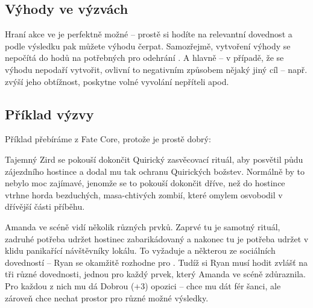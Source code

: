 \documentclass[../main.tex]{subfiles}
\begin{document}
\subsection{Výhody ve výzvách}
\label{sec:výhody-výzvy}

Hraní akce  ve  je perfektně možné – prostě si hodíte
na relevantní dovednost a podle výsledku pak můžete výhodu čerpat. Samozřejmě, vytvoření
výhody se nepočítá do hodů na  potřebných pro odehrání . A
hlavně – v případě, že se výhodu nepodaří vytvořit, ovlivní to negativním způsobem nějaký
jiný cíl – např. zvýší jeho obtížnost, poskytne volné vyvolání nepříteli apod.

\subsection{Příklad výzvy}
\label{sec:příklad-výzvy}

Příklad  přebíráme z Fate Core, protože je prostě dobrý:

Tajemný Zird se pokouší dokončit Quirický zasvěcovací rituál, aby posvětil půdu
zájezdního hostince a dodal mu tak ochranu Quirických božstev. Normálně by to nebylo moc
zajímavé, jenomže se to pokouší dokončit dříve, než do hostince vtrhne horda bezduchých,
masa-chtivých zombií, které omylem osvobodil v dřívější části příběhu.

Amanda ve scéně vidí několik různých prvků. Zaprvé tu je samotný rituál, zadruhé potřeba
udržet hostinec zabarikádovaný a nakonec tu je potřeba udržet v klidu panikařící
návštěvníky lokálu. To vyžaduje a některou ze sociálních dovedností
– Ryan se okamžitě rozhodne pro . Tudíž si Ryan musí hodit zvlášť na tři
různé dovednosti, jednou pro každý prvek, který Amanda ve scéně zdůraznila. Pro každou z
nich mu dá Dobrou (+3) opozici – chce mu dát fér šanci, ale zároveň chce nechat prostor
pro různé možné výsledky.
\end{document}
